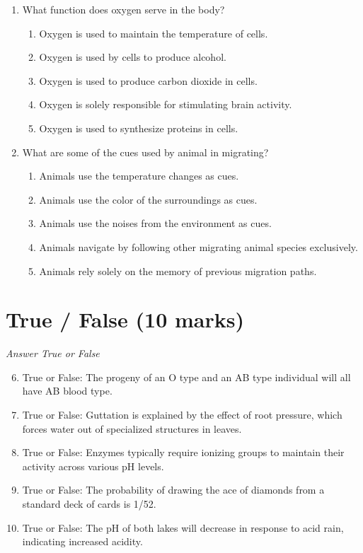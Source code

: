 \documentclass[12pt]{article}
\begin{document}
\begin{enumerate}[label=\arabic*.]
\begin{enumerate}[label=(\alph*)]
\end{enumerate}
\item What function does oxygen serve in the body?
\begin{enumerate}[label=(\alph*)]
    \item Oxygen is used to maintain the temperature of cells.
    \item Oxygen is used by cells to produce alcohol.
    \item Oxygen is used to produce carbon dioxide in cells.
    \item Oxygen is solely responsible for stimulating brain activity.
    \item Oxygen is used to synthesize proteins in cells.
\end{enumerate}
\item What are some of the cues used by animal in migrating?
\begin{enumerate}[label=(\alph*)]
    \item Animals use the temperature changes as cues.
    \item Animals use the color of the surroundings as cues.
    \item Animals use the noises from the environment as cues.
    \item Animals navigate by following other migrating animal species exclusively.
    \item Animals rely solely on the memory of previous migration paths.
\end{enumerate}
\end{enumerate}

\section*{True / False (10 marks)}
\textit{Answer True or False}
\begin{enumerate}[label=\arabic*.]
\setcounter{enumi}{5}
\item True or False: The progeny of an O type and an AB type individual will all have AB blood type.
\item True or False: Guttation is explained by the effect of root pressure, which forces water out of specialized structures in leaves.
\item True or False: Enzymes typically require ionizing groups to maintain their activity across various pH levels.
\item True or False: The probability of drawing the ace of diamonds from a standard deck of cards is 1/52.
\item True or False: The pH of both lakes will decrease in response to acid rain, indicating increased acidity.
\end{enumerate}
\end{document}
